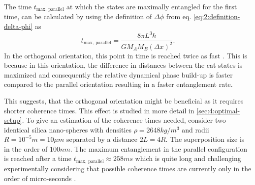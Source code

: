 The time $t_\mathrm{max,\,parallel}$ at which the states are maximally entangled for the first time, can be calculated by using the definition of $\Delta\phi$ from eq. \eqref{eq:2:definition-delta-phi} as
\begin{equation}\label{eq:2:t-max-parallel}
  t_\mathrm{max,\,parallel} = \frac{8 \pi L^3\hbar}{G M_A M_B (\Delta x)^2} .
\end{equation}
In the orthogonal orientation, this point in time is reached twice as fast \cite{Pedernales_2023}. This is because in this orientation, the difference in distances between the cat-states is maximized and consequently the relative dynamical phase build-up is faster compared to the parallel orientation resulting in a faster entanglement rate.

This suggests, that the orthogonal orientation might be beneficial as it requires shorter coherence times. This effect is studied in more detail in \cref{sec:4:optimal-setup}.
To give an estimation of the coherence times needed, consider two identical silica nano-spheres with densities $\rho=2648\si{kg/m^3}$ and radii $R=10^{-5}\si{m}=10\si{\mu m}$ separated by a distance $2L = 4R$.
The superposition size is in the order of $100\si{nm}$.
The maximum entanglement in the parallel configuration is reached after a time $t_\mathrm{max,\,parallel} \approx 258\si{ms}$ which is quite long and challenging experimentally considering that possible coherence times are currently only in the order of micro-seconds \cite{OConnell_2010}.
